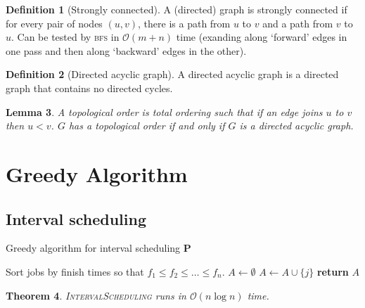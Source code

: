 \documentclass[10pt, oneside, reqno]{amsart}
\theoremstyle{plain}%
\newtheorem{thm}{Theorem}[section]
\newtheorem{lem}[thm]{Lemma}
\theoremstyle{definition}
\newtheorem{defn}[thm]{Definition}
\theoremstyle{remark}
\newcommand{\bigo}[1]{\mathcal{O}(#1)}
\begin{document}
\begin{defn}[Strongly connected]
    A (directed) graph is strongly connected if for every pair of nodes $(u,v)$, there is a path from $u$ to $v$ and a path from $v$ to $u$.  Can be tested by \textsc{bfs} in $\bigo{m+n}$ time (exanding along `forward' edges in one pass and then along `backward' edges in the other).
\end{defn}

\begin{defn}[Directed acyclic graph]
    A directed acyclic graph is a directed graph that contains no directed cycles.  
\end{defn}

\begin{lem}
    A topological order is total ordering such that if an edge joins $u$ to $v$ then $u < v$.
    $G$ has a topological order if and only if $G$ is a directed acyclic graph.
\end{lem}





\section{Greedy Algorithm} %
\label{sec:greedy_algorithm}
\subsection{Interval scheduling} %
\label{sub:interval_scheduling}

\begin{algorithm}[H]
    \label{alg:dynamic_rising_trend}
    \caption{Greedy algorithm for interval scheduling \textbf{P}}
    \begin{algorithmic}[1]
            \State Sort jobs by finish times so that $f_1 \leq f_2 \leq \dots \leq f_n$.
            \State $A \gets \emptyset$
                    \State $A \gets A \cup \{j\}$
                \EndIf
            \EndFor
            \State \textbf{return} $A$
    \EndProcedure
    \end{algorithmic}
\end{algorithm}

\begin{thm}
    \textsc{IntervalScheduling} runs in $\bigo{n \log n}$ time.
\end{thm}
\end{document}
